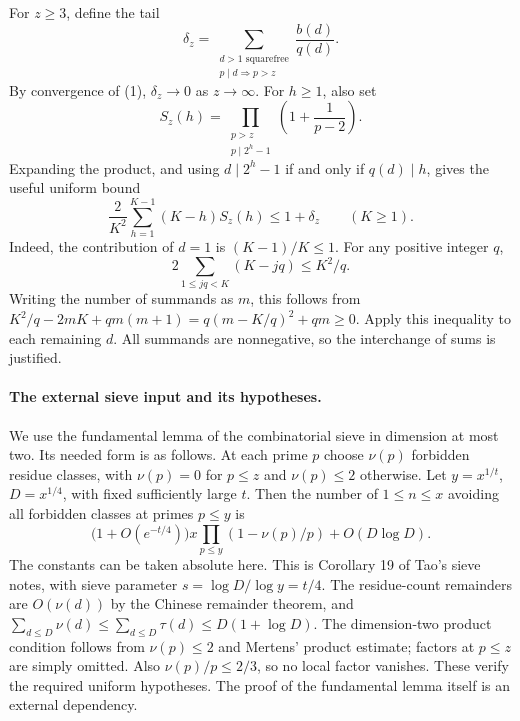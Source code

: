 For \(z\geq3\), define the tail
\[
 \delta_z=\sum_{\substack{d>1\text{ squarefree}\\p\mid d\Rightarrow p>z}}
 \frac{b(d)}{q(d)}.
\]
By convergence of (1), \(\delta_z\to0\) as \(z\to\infty\). For \(h\geq1\), also set
\[
 S_z(h)=\prod_{\substack{p>z\\p\mid2^h-1}}
 \left(1+\frac1{p-2}\right).
\]
Expanding the product, and using \(d\mid2^h-1\) if and only if \(q(d)\mid h\), gives the useful uniform bound
\[
 \frac2{K^2}\sum_{h=1}^{K-1}(K-h)S_z(h)\leq1+\delta_z
 \qquad(K\geq1). \tag{3}
\]
Indeed, the contribution of \(d=1\) is \((K-1)/K\leq1\). For any positive integer \(q\),
\[
 2\sum_{1\leq jq<K}(K-jq)\leq K^2/q.
\]
Writing the number of summands as \(m\), this follows from
\(K^2/q-2mK+qm(m+1)=q(m-K/q)^2+qm\geq0\). Apply this inequality to each remaining \(d\). All summands are nonnegative, so the interchange of sums is justified.

\paragraph{The external sieve input and its hypotheses.}
We use the fundamental lemma of the combinatorial sieve in dimension at most two. Its needed form is as follows. At each prime \(p\) choose \(\nu(p)\) forbidden residue classes, with \(\nu(p)=0\) for \(p\leq z\) and \(\nu(p)\leq2\) otherwise. Let \(y=x^{1/t}\), \(D=x^{1/4}\), with fixed sufficiently large \(t\). Then the number of \(1\leq n\leq x\) avoiding all forbidden classes at primes \(p\leq y\) is
\[
 \bigl(1+O(e^{-t/4})\bigr)x
 \prod_{p\leq y}(1-\nu(p)/p)+O(D\log D). \tag{4}
\]
The constants can be taken absolute here. This is Corollary 19 of Tao's sieve notes, with sieve parameter \(s=\log D/\log y=t/4\). The residue-count remainders are \(O(\nu(d))\) by the Chinese remainder theorem, and
\(\sum_{d\leq D}\nu(d)\leq\sum_{d\leq D}\tau(d)\leq D(1+\log D)\).
The dimension-two product condition follows from \(\nu(p)\leq2\) and Mertens' product estimate; factors at \(p\leq z\) are simply omitted. Also \(\nu(p)/p\leq2/3\), so no local factor vanishes. These verify the required uniform hypotheses. The proof of the fundamental lemma itself is an external dependency.

